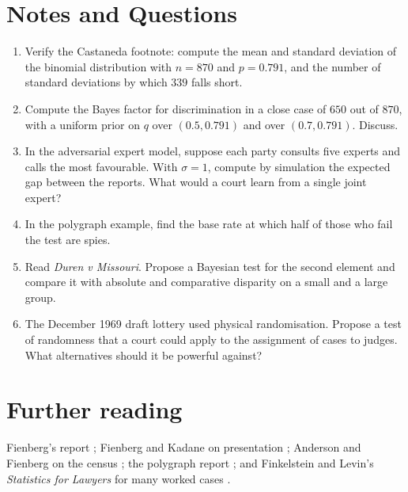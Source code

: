 \section*{Notes and Questions}
\begin{enumerate}[label=\arabic*.]
\item Verify the Castaneda footnote: compute the mean and standard deviation of the binomial distribution with $n = 870$ and $p = 0.791$, and the number of standard deviations by which $339$ falls short.
\item Compute the Bayes factor for discrimination in a close case of $650$ out of $870$, with a uniform prior on $q$ over $(0.5, 0.791)$ and over $(0.7, 0.791)$. Discuss.
\item In the adversarial expert model, suppose each party consults five experts and calls the most favourable. With $\sigma = 1$, compute by simulation the expected gap between the reports. What would a court learn from a single joint expert?
\item In the polygraph example, find the base rate at which half of those who fail the test are spies.
\item Read \emph{Duren v Missouri}. Propose a Bayesian test for the second element and compare it with absolute and comparative disparity on a small and a large group.
\item The December 1969 draft lottery used physical randomisation. Propose a test of randomness that a court could apply to the assignment of cases to judges. What alternatives should it be powerful against?
\end{enumerate}

\section*{Further reading}
Fienberg's report \citep{fienberg1989}; Fienberg and Kadane on presentation \citep{fienberg_kadane1983}; Anderson and Fienberg on the census \citep{anderson1999}; the polygraph report \citep{nrc2003}; and Finkelstein and Levin's \emph{Statistics for Lawyers} for many worked cases \citep{finkelstein2015}.
